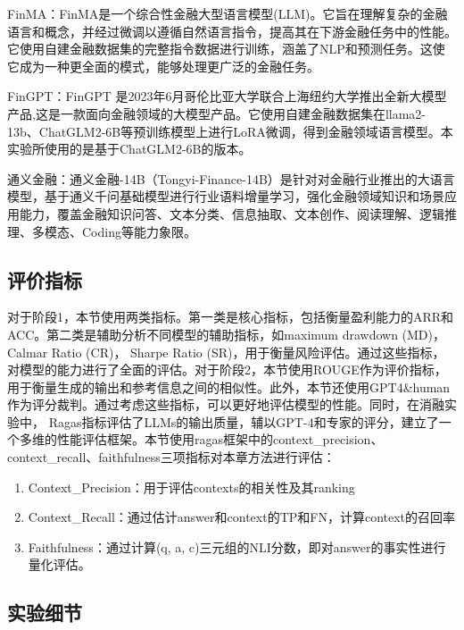 FinMA：FinMA是一个综合性金融大型语言模型(LLM)。它旨在理解复杂的金融语言和概念，并经过微调以遵循自然语言指令，提高其在下游金融任务中的性能。它使用自建金融数据集的完整指令数据进行训练，涵盖了NLP和预测任务。这使它成为一种更全面的模式，能够处理更广泛的金融任务。

FinGPT：FinGPT 是2023年6月哥伦比亚大学联合上海纽约大学推出全新大模型产品,这是一款面向金融领域的大模型产品。它使用自建金融数据集在llama2-13b、ChatGLM2-6B等预训练模型上进行LoRA微调，得到金融领域语言模型。本实验所使用的是基于ChatGLM2-6B的版本。

通义金融：通义金融-14B（Tongyi-Finance-14B）是针对对金融行业推出的大语言模型，基于通义千问基础模型进行行业语料增量学习，强化金融领域知识和场景应用能力，覆盖金融知识问答、文本分类、信息抽取、文本创作、阅读理解、逻辑推理、多模态、Coding等能力象限。

\subsection{评价指标}

对于阶段1，本节使用两类指标。第一类是核心指标，包括衡量盈利能力的ARR和ACC。第二类是辅助分析不同模型的辅助指标，如maximum drawdown (MD)， Calmar Ratio (CR)， Sharpe Ratio (SR)，用于衡量风险评估。通过这些指标，对模型的能力进行了全面的评估。对于阶段2，本节使用ROUGE作为评价指标，用于衡量生成的输出和参考信息之间的相似性。此外，本节还使用GPT4\&human作为评分裁判。通过考虑这些指标，可以更好地评估模型的性能。同时，在消融实验中， 
Ragas\cite{DBLP:conf/eacl/ESJAS24}指标评估了LLMs的输出质量，辅以GPT-4和专家的评分，建立了一个多维的性能评估框架。本节使用ragas框架中的context\_precision、context\_recall、faithfulness三项指标对本章方法进行评估：

\begin{enumerate}[topsep = 0 pt, itemsep= 0 pt, parsep=0pt, partopsep=0pt, leftmargin=0pt, itemindent=44pt, labelsep=6pt, listparindent=24pt, label=\arabic*)]
	\item Context\_Precision：用于评估contexts的相关性及其ranking
	\item Context\_Recall：通过估计answer和context的TP和FN，计算context的召回率
	\item Faithfulness：通过计算(q, a, c)三元组的NLI分数，即对answer的事实性进行量化评估。
\end{enumerate}

\subsection{实验细节}

